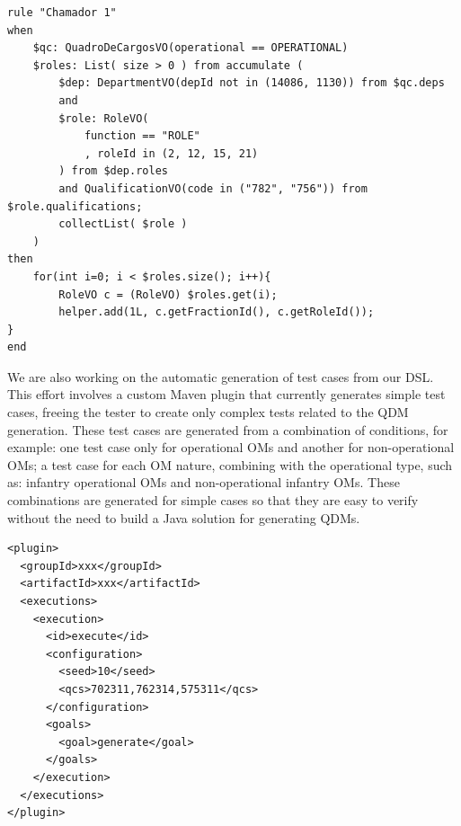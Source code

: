 \begin{lstlisting}[frame=single, language=DRL, caption={\it DRL generated}, label={code:drl}, basicstyle=\scriptsize]
rule "Chamador 1"   	
when
	$qc: QuadroDeCargosVO(operational == OPERATIONAL)	
	$roles: List( size > 0 ) from accumulate ( 
		$dep: DepartmentVO(depId not in (14086, 1130)) from $qc.deps				  		   
		and
		$role: RoleVO(
			function == "ROLE"
			, roleId in (2, 12, 15, 21)  
		) from $dep.roles 		
		and QualificationVO(code in ("782", "756")) from $role.qualifications;				
		collectList( $role )
	) 		
then		 
	for(int i=0; i < $roles.size(); i++){       	
		RoleVO c = (RoleVO) $roles.get(i);
		helper.add(1L, c.getFractionId(), c.getRoleId());   
}               
end	\end{lstlisting}


We are also working on the automatic generation of test cases 
from our DSL. This effort involves a custom Maven plugin that currently generates simple test cases, 
freeing the tester to create only complex tests related to the QDM generation. 
These test cases are generated from a combination of conditions, for example: one test case only for operational OMs 
and another for non-operational OMs; a test case for each OM nature, combining with the operational type, 
such as: infantry operational OMs and non-operational infantry OMs. These combinations are generated for simple 
cases so that they are easy to verify without the need to build a Java solution for generating QDMs. 


\begin{lstlisting}[frame=single, language=Plugin, caption={\it Maven plugin for test generation}, label={code:plugin},basicstyle=\scriptsize]
<plugin>
  <groupId>xxx</groupId>
  <artifactId>xxx</artifactId>
  <executions>
    <execution>
      <id>execute</id>			
      <configuration>
        <seed>10</seed>				
        <qcs>702311,762314,575311</qcs>				
      </configuration>
      <goals>
        <goal>generate</goal>
      </goals>
    </execution>
  </executions>
</plugin>	
\end{lstlisting}



